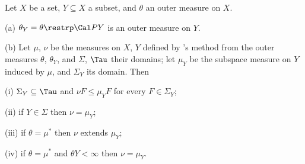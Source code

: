  Let $X$ be a set, $Y\subseteq X$ a subset, and
$\theta$ an outer measure on $X$.

(a) $\theta_Y=\theta\restrp\Cal PY$ is an outer measure on $Y$.

(b) Let $\mu$, $\nu$ be the measures on $X$, $Y$ defined by
\Caratheodory's method from the outer measures $\theta$, $\theta_Y$, and
$\Sigma$, $\Tau$ their domains;  let $\mu_Y$ be the subspace measure on
$Y$ induced by $\mu$, and $\Sigma_Y$ its domain.   Then

\quad (i) $\Sigma_Y\subseteq\Tau$ and $\nu F\le\mu_YF$ for every
$F\in\Sigma_Y$;

\quad(ii) if $Y\in\Sigma$ then $\nu=\mu_Y$;

\quad(iii) if $\theta=\mu^*$ then $\nu$ extends $\mu_Y$;

\quad(iv) if $\theta=\mu^*$ and $\theta Y<\infty$ then $\nu=\mu_Y$.

